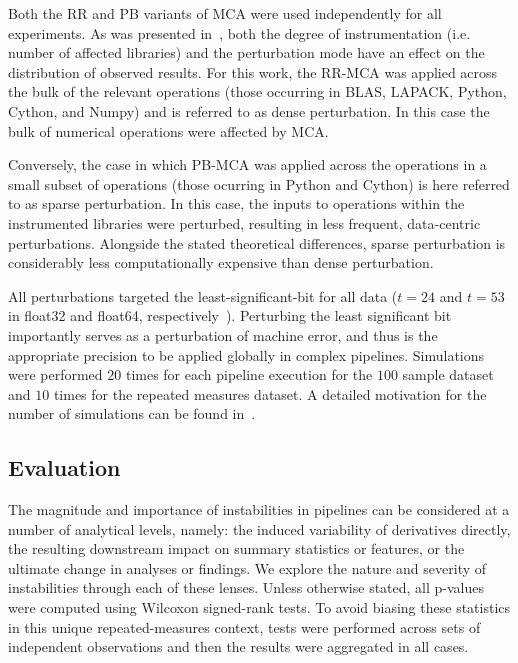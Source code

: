 \documentclass[fleqn,10pt]{SelfArx} %
\newcommand{\new}[1]{{\color{blue} #1}}
\begin{document}
Both the RR and PB variants of MCA were used independently for all experiments. As was presented in~\cite{Kiar2020-lb},
both the degree of instrumentation (i.e. number of affected libraries) and the perturbation mode have an effect on the
distribution of observed results. For this work, the RR-MCA was applied across the bulk of the relevant \new{operations}
\new{(those occurring in BLAS, LAPACK, Python, Cython, and Numpy)} and
is referred to as \new{dense} perturbation. In this case the bulk of numerical operations were affected by MCA.

Conversely, the case in which PB-MCA was applied across the operations in a small subset of operations \new{(those ocurring
in Python and Cython)} is here referred to as \new{sparse} perturbation. In this case, the inputs to operations within the
instrumented libraries were perturbed, resulting in less frequent, data-centric perturbations. Alongside the stated theoretical
differences, \new{sparse} perturbation is considerably less computationally expensive than \new{dense} perturbation.

All perturbations targeted the least-significant-bit for all data ($t=24$ and $t=53$ in float32 and float64,
respectively~\cite{Denis2016-wo}). \new{Perturbing the least significant bit importantly serves as a perturbation of
machine error, and thus is the appropriate precision to be applied globally in complex pipelines.} Simulations were
performed $20$ times for each pipeline execution \new{for the $100$ sample dataset and $10$ times for the repeated
measures dataset}. A detailed motivation for the number of simulations can be found in~\cite{Sohier2018-ts}.

\subsection*{Evaluation}

The magnitude and importance of instabilities in pipelines can be considered at a number of analytical levels, namely:
the induced variability of derivatives directly, the resulting downstream impact on summary statistics or features, or
the ultimate change in analyses or findings. We explore the nature and severity of instabilities through each of these
lenses. Unless otherwise stated, all p-values were computed using Wilcoxon signed-rank tests. \new{To avoid biasing
these statistics in this unique repeated-measures context, tests were performed across sets of independent
observations and then the results were aggregated in all cases.}
\end{document}
